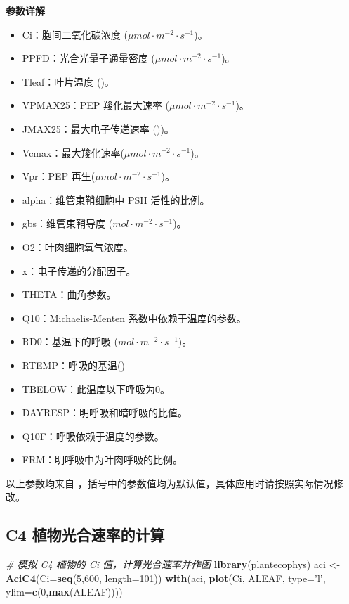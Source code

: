 \documentclass[]{krantz}
\makeatletter
\newenvironment{Shaded}{\begin{snugshade}}{\end{snugshade}}
\newcommand{\KeywordTok}[1]{\textcolor[rgb]{0.13,0.29,0.53}{\textbf{#1}}}
\newcommand{\DataTypeTok}[1]{\textcolor[rgb]{0.13,0.29,0.53}{#1}}
\newcommand{\DecValTok}[1]{\textcolor[rgb]{0.00,0.00,0.81}{#1}}
\newcommand{\StringTok}[1]{\textcolor[rgb]{0.31,0.60,0.02}{#1}}
\newcommand{\CommentTok}[1]{\textcolor[rgb]{0.56,0.35,0.01}{\textit{#1}}}
\newcommand{\NormalTok}[1]{#1}
\providecommand{\tightlist}{%
  \setlength{\itemsep}{0pt}\setlength{\parskip}{0pt}}
\newenvironment{kframe}{%
\medskip{}
\setlength{\fboxsep}{.8em}
 \def\at@end@of@kframe{}%
 \ifinner\ifhmode%
  \def\at@end@of@kframe{\end{minipage}}%
  \begin{minipage}{\columnwidth}%
 \fi\fi%
 \def\FrameCommand##1{\hskip\@totalleftmargin \hskip-\fboxsep
 \colorbox{shadecolor}{##1}\hskip-\fboxsep
     \hskip-\linewidth \hskip-\@totalleftmargin \hskip\columnwidth}%
 \MakeFramed {\advance\hsize-\width
   \@totalleftmargin\z@ \linewidth\hsize
   \@setminipage}}%
 {\par\unskip\endMakeFramed%
 \at@end@of@kframe}
\renewenvironment{Shaded}{\begin{kframe}}{\end{kframe}}
\theoremstyle{definition}
\theoremstyle{definition}
\theoremstyle{definition}
\theoremstyle{remark}
\makeatother
\begin{document}
\textbf{参数详解}

\begin{itemize}
\tightlist
\item
  Ci：胞间二氧化碳浓度 (\(\mu mol\cdot m^{-2}\cdot s^{-1}\))。
\item
  PPFD：光合光量子通量密度 (\(\mu mol\cdot m^{-2}\cdot s^{-1}\))。
\item
  Tleaf：叶片温度 (\textcelsius)。
\item
  VPMAX25：PEP 羧化最大速率 (\(\mu mol\cdot m^{-2}\cdot s^{-1}\))。
\item
  JMAX25：最大电子传递速率 (\textcelsius))。
\item
  Vcmax：最大羧化速率(\(\mu mol\cdot m^{-2}\cdot s^{-1}\))。
\item
  Vpr：PEP 再生(\(\mu mol\cdot m^{-2}\cdot s^{-1}\))。
\item
  alpha：维管束鞘细胞中 PSII 活性的比例。
\item
  gbs：维管束鞘导度 (\(mol\cdot m^{-2}\cdot s^{-1}\))。
\item
  O2：叶肉细胞氧气浓度。
\item
  x：电子传递的分配因子。
\item
  THETA：曲角参数。
\item
  Q10：Michaelis-Menten 系数中依赖于温度的参数。
\item
  RD0：基温下的呼吸 (\(mol\cdot m^{-2}\cdot s^{-1}\))。
\item
  RTEMP：呼吸的基温(\textcelsius)
\item
  TBELOW：此温度以下呼吸为0。
\item
  DAYRESP：明呼吸和暗呼吸的比值。
\item
  Q10F：呼吸依赖于温度的参数。
\item
  FRM：明呼吸中为叶肉呼吸的比例。
\end{itemize}

以上参数均来自
\citet{Caemmerer2000Biochemical}，括号中的参数值均为默认值，具体应用时请按照实际情况修改。

\subsection{C4 植物光合速率的计算}\label{c4_sim}

\begin{Shaded}
\begin{Highlighting}[]
\CommentTok{# 模拟 C4 植物的 Ci 值，计算光合速率并作图}
\KeywordTok{library}\NormalTok{(plantecophys)}
\NormalTok{aci <-}\StringTok{ }\KeywordTok{AciC4}\NormalTok{(}\DataTypeTok{Ci=}\KeywordTok{seq}\NormalTok{(}\DecValTok{5}\NormalTok{,}\DecValTok{600}\NormalTok{, }\DataTypeTok{length=}\DecValTok{101}\NormalTok{))}
\KeywordTok{with}\NormalTok{(aci, }\KeywordTok{plot}\NormalTok{(Ci, ALEAF, }\DataTypeTok{type=}\StringTok{'l'}\NormalTok{, }\DataTypeTok{ylim=}\KeywordTok{c}\NormalTok{(}\DecValTok{0}\NormalTok{,}\KeywordTok{max}\NormalTok{(ALEAF))))}
\end{Highlighting}
\end{Shaded}
\end{document}
